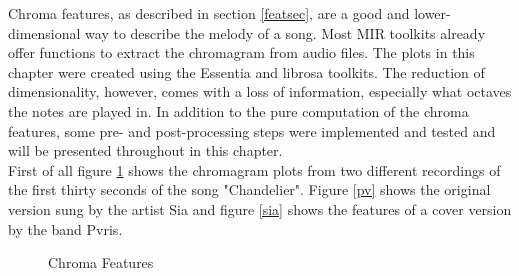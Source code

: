 Chroma features, as described in section \ref{featsec}, are a good and lower-dimensional way to describe the melody of a song. Most MIR toolkits already offer functions to extract the chromagram from audio files. The plots in this chapter were created using the Essentia \cite{essentia1} and librosa \cite{librosa1} toolkits. 
The reduction of dimensionality, however, comes with a loss of information, especially what octaves the notes are played in. In addition to the pure computation of the chroma features, some pre- and post-processing steps were implemented and tested and will be presented throughout in this chapter.\\
First of all figure \ref{fig:chroma1} shows the chromagram plots from two different recordings of the first thirty seconds of the song "Chandelier". Figure \ref{pv} shows the original version sung by the artist Sia and figure \ref{sia} shows the features of a cover version by the band Pvris. 
\begin{figure}[htbp]
	\centering
	\caption{Chroma Features}
	\label{fig:chroma1}
\end{figure}
